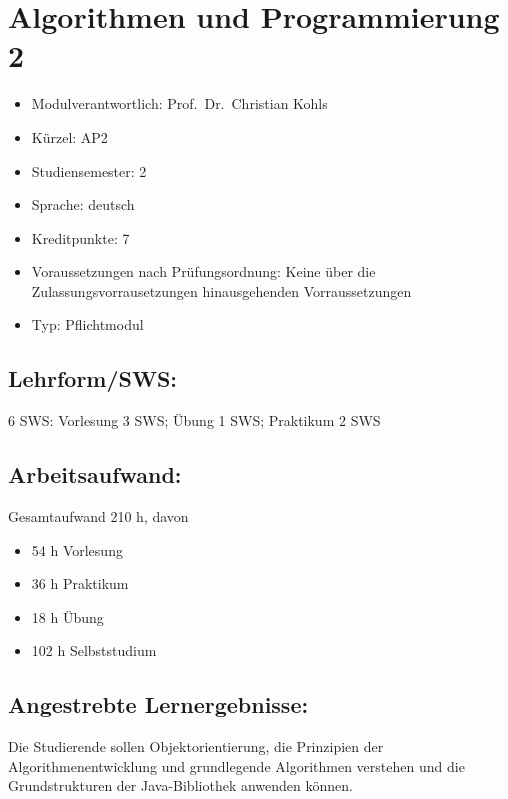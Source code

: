\chapter{Algorithmen und Programmierung
2}\label{algorithmen-und-programmierung-2}

\begin{itemize}
\tightlist
\item
  Modulverantwortlich: Prof.~Dr.~Christian Kohls
\item
  Kürzel: AP2
\item
  Studiensemester: 2
\item
  Sprache: deutsch
\item
  Kreditpunkte: 7
\item
  Voraussetzungen nach Prüfungsordnung: Keine über die
  Zulassungsvorrausetzungen hinausgehenden Vorraussetzungen
\item
  Typ: Pflichtmodul
\end{itemize}

\section*{Lehrform/SWS:}\label{lehrformsws-1}

6 SWS: Vorlesung 3 SWS; Übung 1 SWS; Praktikum 2 SWS

\section*{Arbeitsaufwand:}\label{arbeitsaufwand-1}

Gesamtaufwand 210 h, davon

\begin{itemize}
\tightlist
\item
  54 h Vorlesung
\item
  36 h Praktikum
\item
  18 h Übung
\item
  102 h Selbststudium
\end{itemize}

\section*{Angestrebte
Lernergebnisse:}\label{angestrebte-lernergebnisse-1}

Die Studierende sollen Objektorientierung, die Prinzipien der
Algorithmenentwicklung und grundlegende Algorithmen verstehen und die
Grundstrukturen der Java-Bibliothek anwenden können.

